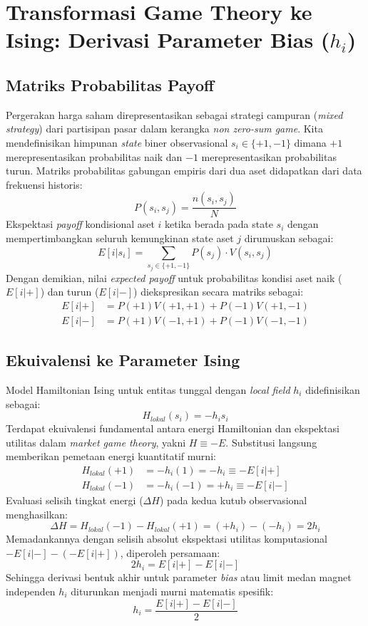 \section{Transformasi Game Theory ke Ising: Derivasi Parameter Bias (\texorpdfstring{\(h_i\)}{h\_i})}\label{appendix-i}

\subsection{Matriks Probabilitas Payoff}\label{konstruksi-matriks-probabilitas-payoff}
Pergerakan harga saham direpresentasikan sebagai strategi campuran (\emph{mixed strategy}) dari partisipan pasar dalam kerangka \emph{non zero-sum game}. Kita mendefinisikan himpunan \emph{state} biner observasional \(s_i \in \{+1, -1\}\) dimana \(+1\) merepresentasikan probabilitas naik dan \(-1\) merepresentasikan probabilitas turun. Matriks probabilitas gabungan empiris dari dua aset didapatkan dari data frekuensi historis:
\[ P(s_i, s_j) = \frac{n(s_i, s_j)}{N} \]
Ekspektasi \emph{payoff} kondisional aset \(i\) ketika berada pada state \(s_i\) dengan mempertimbangkan seluruh kemungkinan state aset \(j\) dirumuskan sebagai:
\[ E[i|s_i] = \sum_{s_j \in \{+1, -1\}} P(s_j) \cdot V(s_i, s_j) \]
Dengan demikian, nilai \emph{expected payoff} untuk probabilitas kondisi aset naik (\(E[i|+]\)) dan turun (\(E[i|-]\)) diekspresikan secara matriks sebagai:
\begin{align}
E[i|+] &= P(+1)V(+1,+1) + P(-1)V(+1,-1) \\
E[i|-] &= P(+1)V(-1,+1) + P(-1)V(-1,-1) 
\end{align}

\subsection{Ekuivalensi ke Parameter Ising}\label{ekuivalensi-parameter-hamiltonian}
Model Hamiltonian Ising untuk entitas tunggal dengan \emph{local field} \(h_i\) didefinisikan sebagai:
\[ H_{lokal}(s_i) = -h_i s_i \]
Terdapat ekuivalensi fundamental antara energi Hamiltonian dan ekspektasi utilitas dalam \emph{market game theory}, yakni \(H \equiv -E\). Substitusi langsung memberikan pemetaan energi kuantitatif murni:
\begin{align}
H_{lokal}(+1) &= -h_i(1) = -h_i \equiv -E[i|+] \\
H_{lokal}(-1) &= -h_i(-1) = +h_i \equiv -E[i|-]
\end{align}
Evaluasi selisih tingkat energi (\(\Delta H\)) pada kedua kutub observasional menghasilkan:
\[ \Delta H = H_{lokal}(-1) - H_{lokal}(+1) = (+h_i) - (-h_i) = 2h_i \]
Memadankannya dengan selisih absolut ekspektasi utilitas komputasional \(-E[i|-] - (-E[i|+])\), diperoleh persamaan:
\[ 2h_i = E[i|+] - E[i|-] \]
Sehingga derivasi bentuk akhir untuk parameter \emph{bias} atau limit medan magnet independen \(h_i\) diturunkan menjadi murni matematis spesifik:
\[ h_i = \frac{E[i|+] - E[i|-]}{2} \]
